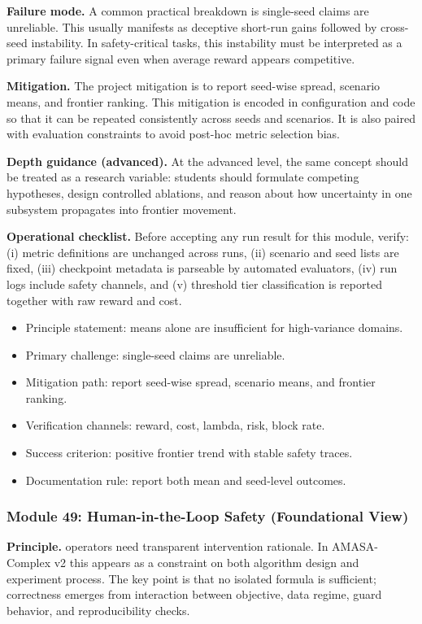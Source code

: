 \documentclass[conference]{IEEEtran}
\begin{document}
\textbf{Failure mode.} A common practical breakdown is single-seed claims are unreliable. This usually manifests as deceptive short-run gains followed by cross-seed instability. In safety-critical tasks, this instability must be interpreted as a primary failure signal even when average reward appears competitive.

\textbf{Mitigation.} The project mitigation is to report seed-wise spread, scenario means, and frontier ranking. This mitigation is encoded in configuration and code so that it can be repeated consistently across seeds and scenarios. It is also paired with evaluation constraints to avoid post-hoc metric selection bias.

\textbf{Depth guidance (advanced).} At the advanced level, the same concept should be treated as a research variable: students should formulate competing hypotheses, design controlled ablations, and reason about how uncertainty in one subsystem propagates into frontier movement.

\textbf{Operational checklist.} Before accepting any run result for this module, verify: (i) metric definitions are unchanged across runs, (ii) scenario and seed lists are fixed, (iii) checkpoint metadata is parseable by automated evaluators, (iv) run logs include safety channels, and (v) threshold tier classification is reported together with raw reward and cost.

\begin{itemize}[leftmargin=*]
  \item Principle statement: means alone are insufficient for high-variance domains.
  \item Primary challenge: single-seed claims are unreliable.
  \item Mitigation path: report seed-wise spread, scenario means, and frontier ranking.
  \item Verification channels: reward, cost, lambda, risk, block rate.
  \item Success criterion: positive frontier trend with stable safety traces.
  \item Documentation rule: report both mean and seed-level outcomes.
\end{itemize}


\subsubsection{Module 49: Human-in-the-Loop Safety (Foundational View)}
\textbf{Principle.} operators need transparent intervention rationale. In AMASA-Complex v2 this appears as a constraint on both algorithm design and experiment process. The key point is that no isolated formula is sufficient; correctness emerges from interaction between objective, data regime, guard behavior, and reproducibility checks.
\end{document}
